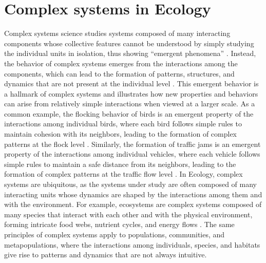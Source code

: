 \section{\label{sec:Complex systems in Ecology} Complex systems in Ecology}

Complex systems science studies systems composed of many interacting components
whose collective features cannot be understood by simply studying the
individual units in isolation, thus showing ``emergent phenomena''
\cite{Bianconi_2023}. Instead, the behavior of complex systems emerges from the
interactions among the components, which can lead to the formation of patterns,
structures, and dynamics that are not present at the individual level \addref.
This emergent behavior is a hallmark of complex systems and illustrates how new
properties and behaviors can arise from relatively simple interactions when
viewed at a larger scale. As a common example, the flocking behavior of birds
is an emergent property of the interactions among individual birds, where each
bird follows simple rules to maintain cohesion with its neighbors, leading to
the formation of complex patterns at the flock level \addref. Similarly, the
formation of traffic jams is an emergent property of the interactions among
individual vehicles, where each vehicle follows simple rules to maintain a safe
distance from its neighbors, leading to the formation of complex patterns at
the traffic flow level \addref. In Ecology, complex systems are ubiquitous, as
the systems under study are often composed of many interacting units whose
dynamics are shaped by the interactions among them and with the environment.
For example, ecosystems are complex systems composed of many species that
interact with each other and with the physical environment, forming intricate
food webs, nutrient cycles, and energy flows \addref. The same principles of
complex systems apply to populations, communities, and metapopulations, where
the interactions among individuals, species, and habitats give rise to patterns
and dynamics that are not always intuitive.

